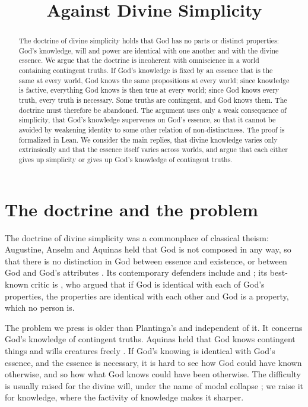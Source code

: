 \documentclass{situationist-preprint}
\title{Against Divine Simplicity}
\begin{document}
\maketitle

\begin{abstract}
The doctrine of divine simplicity holds that God has no parts or distinct properties: God's knowledge, will and power are identical with one another and with the divine essence. We argue that the doctrine is incoherent with omniscience in a world containing contingent truths. If God's knowledge is fixed by an essence that is the same at every world, God knows the same propositions at every world; since knowledge is factive, everything God knows is then true at every world; since God knows every truth, every truth is necessary. Some truths are contingent, and God knows them. The doctrine must therefore be abandoned. The argument uses only a weak consequence of simplicity, that God's knowledge supervenes on God's essence, so that it cannot be avoided by weakening identity to some other relation of non-distinctness. The proof is formalized in Lean. We consider the main replies, that divine knowledge varies only extrinsically and that the essence itself varies across worlds, and argue that each either gives up simplicity or gives up God's knowledge of contingent truths.
\end{abstract}

\section{The doctrine and the problem}

The doctrine of divine simplicity was a commonplace of classical theism: Augustine, Anselm and Aquinas held that God is not composed in any way, so that there is no distinction in God between essence and existence, or between God and God's attributes \citep[I, q.~3]{Aquinas}. Its contemporary defenders include \citet{StumpKretzmann1985} and \citet{Brower2008}; its best-known critic is \citet{Plantinga1980}, who argued that if God is identical with each of God's properties, the properties are identical with each other and God is a property, which no person is.

The problem we press is older than Plantinga's and independent of it. It concerns God's knowledge of contingent truths. Aquinas held that God knows contingent things \citep[I, q.~14, a.~13]{Aquinas} and wills creatures freely \citep[I, q.~19, a.~3]{Aquinas}. If God's knowing is identical with God's essence, and the essence is necessary, it is hard to see how God could have known otherwise, and so how what God knows could have been otherwise. The difficulty is usually raised for the divine will, under the name of modal collapse \citep{Mullins2013}; we raise it for knowledge, where the factivity of knowledge makes it sharper.
\end{document}
